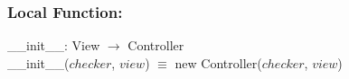 \documentclass[12pt]{article}
\begin{document}

\subsubsection*{Local Function:}

\_\_init\_\_: View $\rightarrow$ Controller \\
\_\_init\_\_($checker$, $view$) $\equiv$ new Controller($checker$, $view$) \\






\end{document}
